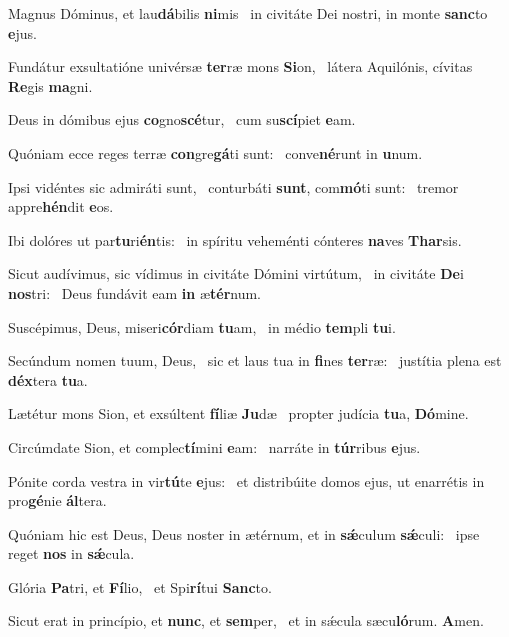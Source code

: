 \item Magnus Dóminus, et lau\textbf{dá}bilis \textbf{ni}mis~\psstar{} in civitáte Dei nostri, in monte \textbf{sanc}to \textbf{e}jus.
\item Fundátur exsultatióne univérsæ \textbf{ter}ræ mons \textbf{Si}on,~\psstar{} látera Aquilónis, cívitas \textbf{Re}gis \textbf{ma}gni.
\item Deus in dómibus ejus \textbf{co}gno\textbf{scé}tur,~\psstar{} cum su\textbf{scí}piet \textbf{e}am.
\item Quóniam ecce reges terræ \textbf{con}gre\textbf{gá}ti sunt:~\psstar{} conve\textbf{né}runt in \textbf{u}num.
\item Ipsi vidéntes sic admiráti sunt,~\pscross{} conturbáti \textbf{sunt}, com\textbf{mó}ti sunt:~\psstar{} tremor appre\textbf{hén}dit \textbf{e}os.
\item Ibi dolóres ut par\textbf{tu}ri\textbf{én}tis:~\psstar{} in spíritu veheménti cónteres \textbf{na}ves \textbf{Thar}sis.
\item Sicut audívimus, sic vídimus in civitáte Dómini virtútum,~\pscross{} in civitáte \textbf{De}i \textbf{nos}tri:~\psstar{} Deus fundávit eam \textbf{in} æ\textbf{tér}num.
\item Suscépimus, Deus, miseri\textbf{cór}diam \textbf{tu}am,~\psstar{} in médio \textbf{tem}pli \textbf{tu}i.
\item Secúndum nomen tuum, Deus,~\pscross{} sic et laus tua in \textbf{fi}nes \textbf{ter}ræ:~\psstar{} justítia plena est \textbf{déx}tera \textbf{tu}a.
\item Lætétur mons Sion, et exsúltent \textbf{fí}liæ \textbf{Ju}dæ~\psstar{} propter judícia \textbf{tu}a, \textbf{Dó}mine.
\item Circúmdate Sion, et complec\textbf{tí}mini \textbf{e}am:~\psstar{} narráte in \textbf{túr}ribus \textbf{e}jus.
\item Pónite corda vestra in vir\textbf{tú}te \textbf{e}jus:~\psstar{} et distribúite domos ejus, ut enarrétis in pro\textbf{gé}nie \textbf{ál}tera.
\item Quóniam hic est Deus, Deus noster in ætérnum, et in \textbf{sǽ}culum \textbf{sǽ}culi:~\psstar{} ipse reget \textbf{nos} in \textbf{sǽ}cula.
\item Glória \textbf{Pa}tri, et \textbf{Fí}lio,~\psstar{} et Spi\textbf{rí}tui \textbf{Sanc}to.
\item Sicut erat in princípio, et \textbf{nunc}, et \textbf{sem}per,~\psstar{} et in sǽcula sæcu\textbf{ló}rum. \textbf{A}men.
